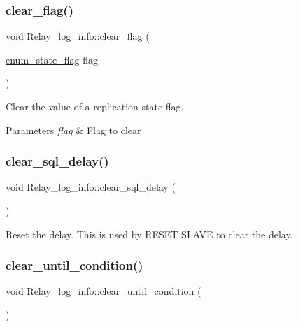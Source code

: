 \subsubsection{\texorpdfstring{clear\+\_\+flag()}{clear\_flag()}}
{\footnotesize\ttfamily void Relay\+\_\+log\+\_\+info\+::clear\+\_\+flag (\begin{DoxyParamCaption}\item[{\mbox{\hyperlink{classRelay__log__info_a768d1f6426a20be0e32d7380a231c0b2}{enum\+\_\+state\+\_\+flag}}}]{flag }\end{DoxyParamCaption})\hspace{0.3cm}{\ttfamily [inline]}}

Clear the value of a replication state flag.


\begin{DoxyParams}{Parameters}
{\em flag} & Flag to clear \\
\hline
\end{DoxyParams}
\mbox{\label{classRelay__log__info_a8c111e744f81a92f66b54efc06b48995}} 
\subsubsection{\texorpdfstring{clear\+\_\+sql\+\_\+delay()}{clear\_sql\_delay()}}
{\footnotesize\ttfamily void Relay\+\_\+log\+\_\+info\+::clear\+\_\+sql\+\_\+delay (\begin{DoxyParamCaption}{ }\end{DoxyParamCaption})\hspace{0.3cm}{\ttfamily [inline]}}

Reset the delay. This is used by R\+E\+S\+ET S\+L\+A\+VE to clear the delay. \mbox{\label{classRelay__log__info_a8b1c765fea358e45de13c29ba9f778a2}} 
\subsubsection{\texorpdfstring{clear\+\_\+until\+\_\+condition()}{clear\_until\_condition()}}
{\footnotesize\ttfamily void Relay\+\_\+log\+\_\+info\+::clear\+\_\+until\+\_\+condition (\begin{DoxyParamCaption}{ }\end{DoxyParamCaption})}

